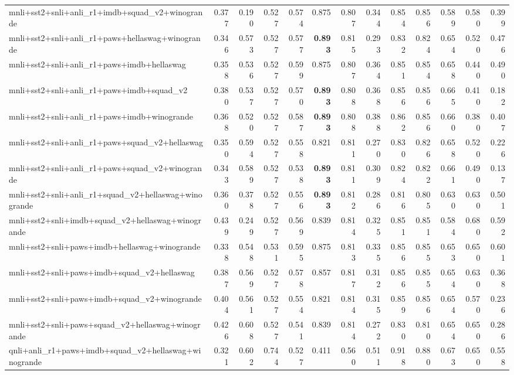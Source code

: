 \begin{table}[t]
\begin{tabular}{lrrrrrrrrrrrr}
    mnli+sst2+snli+anli\_r1+imdb+squad\_v2+winogrande & 0.377 & 0.190 & 0.527 & 0.574 & 0.875 & 0.807 & 0.344 & 0.854 & 0.856 & 0.589 & 0.580 & 0.399 \\
    mnli+sst2+snli+anli\_r1+paws+hellaswag+winogrande & 0.346 & 0.573 & 0.527 & 0.577 & \textbf{0.893} & 0.815 & 0.293 & 0.832 & 0.824 & 0.654 & 0.520 & 0.476 \\
    mnli+sst2+snli+anli\_r1+paws+imdb+hellaswag & 0.358 & 0.536 & 0.527 & 0.599 & 0.875 & 0.807 & 0.364 & 0.851 & 0.854 & 0.658 & 0.440 & 0.490 \\
    mnli+sst2+snli+anli\_r1+paws+imdb+squad\_v2 & 0.380 & 0.537 & 0.527 & 0.570 & \textbf{0.893} & 0.808 & 0.368 & 0.856 & 0.856 & 0.665 & 0.410 & 0.182 \\
    mnli+sst2+snli+anli\_r1+paws+imdb+winogrande & 0.368 & 0.520 & 0.527 & 0.587 & \textbf{0.893} & 0.808 & 0.388 & 0.862 & 0.856 & 0.660 & 0.380 & 0.407 \\
    mnli+sst2+snli+anli\_r1+paws+squad\_v2+hellaswag & 0.350 & 0.594 & 0.527 & 0.558 & 0.821 & 0.811 & 0.270 & 0.830 & 0.826 & 0.658 & 0.520 & 0.226 \\
    mnli+sst2+snli+anli\_r1+paws+squad\_v2+winogrande & 0.343 & 0.589 & 0.527 & 0.538 & \textbf{0.893} & 0.811 & 0.309 & 0.824 & 0.822 & 0.661 & 0.490 & 0.137 \\
    mnli+sst2+snli+anli\_r1+squad\_v2+hellaswag+winogrande & 0.360 & 0.378 & 0.527 & 0.556 & \textbf{0.893} & 0.812 & 0.286 & 0.816 & 0.805 & 0.630 & 0.630 & 0.501 \\
    mnli+sst2+snli+imdb+squad\_v2+hellaswag+winogrande & 0.439 & 0.249 & 0.527 & 0.569 & 0.839 & 0.814 & 0.325 & 0.851 & 0.851 & 0.584 & 0.680 & 0.592 \\
    mnli+sst2+snli+paws+imdb+hellaswag+winogrande & 0.338 & 0.548 & 0.531 & 0.595 & 0.875 & 0.813 & 0.335 & 0.856 & 0.855 & 0.653 & 0.650 & 0.601 \\
    mnli+sst2+snli+paws+imdb+squad\_v2+hellaswag & 0.387 & 0.569 & 0.527 & 0.578 & 0.857 & 0.817 & 0.312 & 0.856 & 0.855 & 0.654 & 0.630 & 0.368 \\
    mnli+sst2+snli+paws+imdb+squad\_v2+winogrande & 0.404 & 0.561 & 0.527 & 0.554 & 0.821 & 0.814 & 0.315 & 0.859 & 0.856 & 0.654 & 0.570 & 0.236 \\
    mnli+sst2+snli+paws+squad\_v2+hellaswag+winogrande & 0.426 & 0.608 & 0.527 & 0.541 & 0.839 & 0.814 & 0.272 & 0.830 & 0.810 & 0.654 & 0.650 & 0.286 \\
    qnli+anli\_r1+paws+imdb+squad\_v2+hellaswag+winogrande & 0.321 & 0.602 & 0.744 & 0.527 & 0.411 & 0.560 & 0.511 & 0.918 & 0.880 & 0.673 & 0.650 & 0.558 \\

\end{tabular}
\end{table}
